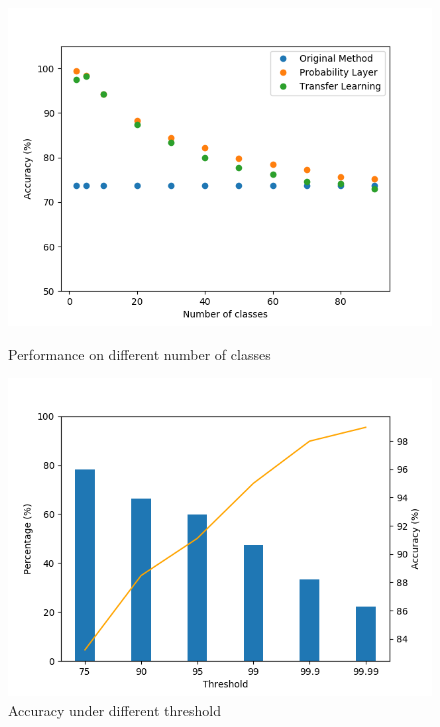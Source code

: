 \documentclass[pageno]{jpaper}
\begin{document}
\begin{figure}[!tbp]
  \centering
  \begin{minipage}[b]{0.235\textwidth}
        \centering
        \includegraphics[width=\textwidth]{PLvsRetrain}
        \caption{Performance on different number of classes}
        \label{fig:PLvsRetrain}
  \end{minipage}
  \hfill
  \begin{minipage}[b]{0.235\textwidth}
        \centering
        \includegraphics[width=\textwidth]{threshold}
        \caption{Accuracy under different threshold}
        \label{fig:threshold}
  \end{minipage}
\end{figure}
\end{document}
